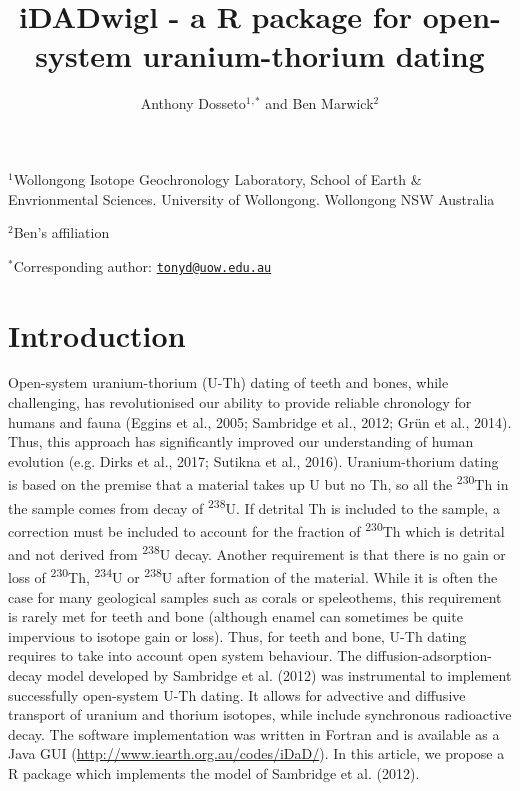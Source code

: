 \documentclass[]{article}
\title{iDADwigl - a R package for open-system uranium-thorium dating}
\author{Anthony Dosseto\(^1\)\(^,\)\(^*\) and Ben Marwick\(^2\)}
\date{}
\begin{document}
\maketitle

\(^1\)Wollongong Isotope Geochronology Laboratory, School of Earth \&
Envrionmental Sciences. University of Wollongong. Wollongong NSW
Australia

\(^2\)Ben's affiliation

\(^*\)Corresponding author:
\href{mailto:tonyd@uow.edu.au}{\nolinkurl{tonyd@uow.edu.au}}

\newpage
\linenumbers

\hypertarget{introduction}{%
\section{Introduction}\label{introduction}}

Open-system uranium-thorium (U-Th) dating of teeth and bones, while
challenging, has revolutionised our ability to provide reliable
chronology for humans and fauna (Eggins et al., 2005; Sambridge et al.,
2012; Grün et al., 2014). Thus, this approach has significantly improved
our understanding of human evolution (e.g. Dirks et al., 2017; Sutikna
et al., 2016). Uranium-thorium dating is based on the premise that a
material takes up U but no Th, so all the \textsuperscript{230}Th in the
sample comes from decay of \textsuperscript{238}U. If detrital Th is
included to the sample, a correction must be included to account for the
fraction of \textsuperscript{230}Th which is detrital and not derived
from \textsuperscript{238}U decay. Another requirement is that there is
no gain or loss of \textsuperscript{230}Th, \textsuperscript{234}U or
\textsuperscript{238}U after formation of the material. While it is
often the case for many geological samples such as corals or
speleothems, this requirement is rarely met for teeth and bone (although
enamel can sometimes be quite impervious to isotope gain or loss). Thus,
for teeth and bone, U-Th dating requires to take into account open
system behaviour. The diffusion-adsorption-decay model developed by
Sambridge et al. (2012) was instrumental to implement successfully
open-system U-Th dating. It allows for advective and diffusive transport
of uranium and thorium isotopes, while include synchronous radioactive
decay. The software implementation was written in Fortran and is
available as a Java GUI (\url{http://www.iearth.org.au/codes/iDaD/}). In
this article, we propose a R package which implements the model of
Sambridge et al. (2012).
\end{document}

